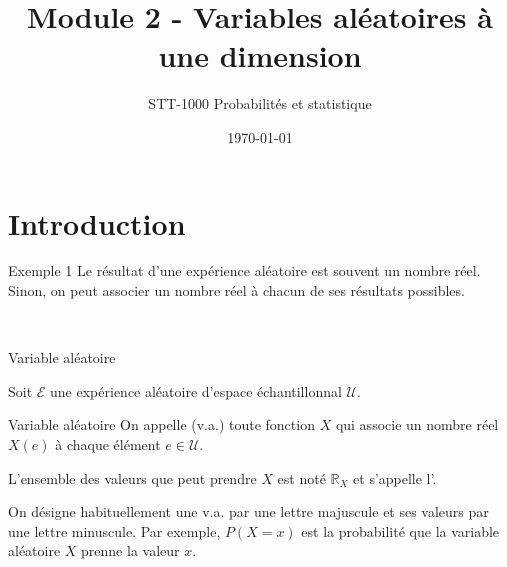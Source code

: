 \documentclass{BeamerTemplate}
\title{Module 2 - Variables aléatoires à une dimension}
\subtitle{STT-1000 Probabilités et statistique}
\date{\today}
\begin{document}
\begin{frame}[t]
  \titlepage
\end{frame}

\section{Introduction}
\begin{frame}[t]{Exemple 1}
Le résultat d'une expérience aléatoire est souvent un nombre réel. Sinon, on peut associer un nombre réel à chacun de ses résultats possibles.

\medskip
{\ }

\end{frame}

\begin{frame}{Variable aléatoire}

Soit $\mathcal{E}$ une expérience aléatoire d'espace échantillonnal $\mathcal{U}$.

 \begin{Boite}{Variable aléatoire}
On appelle  (v.a.) toute fonction $X$ qui associe un nombre réel $X(e)$ à chaque élément $e\in \mathcal{U}$.

\medskip

L'ensemble des valeurs que peut prendre $X$ est noté $\mathbb{R}_X$ et s'appelle l'.
 \end{Boite}
On désigne habituellement une v.a. par une lettre majuscule et ses valeurs par une lettre minuscule. Par exemple, $P(X=x)$ est la probabilité que la variable aléatoire $X$ prenne la valeur $x$.

\end{frame}
\end{document}
